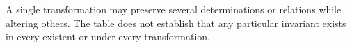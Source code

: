\begin{center}
\begin{minipage}{0.95\textwidth}
A single transformation may preserve several
determinations or relations while altering others.
The table does not establish that any particular
invariant exists in every existent or under
every transformation.

\end{minipage}
\end{center}

